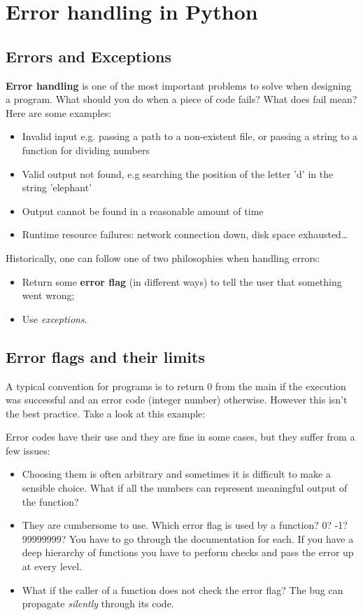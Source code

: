 \section{Error handling in Python}

\subsection{Errors and Exceptions}
\textbf{Error handling} is one of the most important problems to solve when designing a program. What should you do when a piece of code fails? What does fail mean? Here are some examples:
\begin{itemize}
    \item[-] Invalid input e.g. passing a path to a non-existent file, or passing a string to a function for dividing numbers
    \item[-] Valid output not found, e.g searching the position of the letter 'd' in the string 'elephant'
    \item[-] Output cannot be found in a reasonable amount of time
    \item[-] Runtime resource failures: network connection down, disk space exhausted\dots
\end{itemize}

Historically, one can follow one of two philosophies when handling errors:
\begin{itemize}
    \item[-] Return some \textbf{error flag} (in different ways) to tell the user that something went wrong;
    \item[-] Use \textit{exceptions}.
\end{itemize}

\subsection{Error flags and their limits}

A typical convention for programs is to return 0 from the main if the execution was successful and an error code (integer number) otherwise. However this isn't the best practice. Take a look at this example:



Error codes have their use and they are fine in some cases, but they suffer from a few issues:
\begin{itemize}
    \item[-] Choosing them is often arbitrary and sometimes it is difficult to make a sensible choice. What if all the numbers can represent meaningful output of the function?
    \item[-] They are cumbersome to use. Which error flag is used by a function? 0? -1? 99999999? You have to go through the documentation for each. If you have a deep hierarchy of functions you have to perform checks and pass the error up at every level.
    \item[-] What if the caller of a function does not check the error flag? The bug can propagate \textit{silently} through its code.
\end{itemize}

